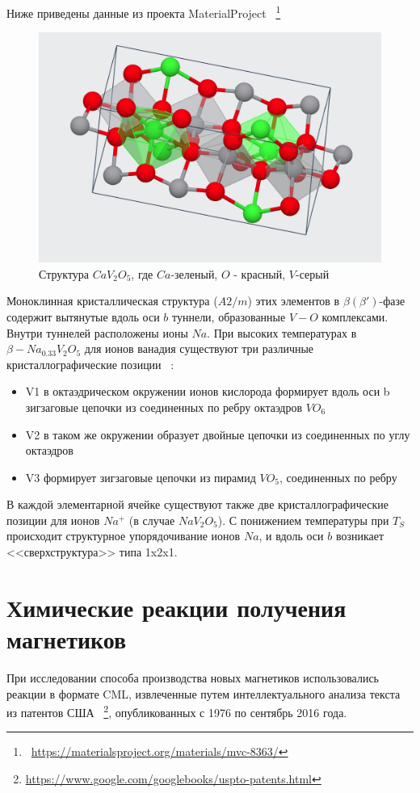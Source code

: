 \documentclass[11pt]{article}
\begin{document}
Ниже приведены данные из проекта MaterialProject ~\footnote{~\url{https://materialsproject.org/materials/mvc-8363/}}

\begin{figure}[htp]
\centering
\includegraphics[scale=0.7]{CaV_2O5}
\caption{Структура $CaV_2O_5$, где $Ca$-зеленый, $O$ - красный, $V$-серый}
\label{}
\end{figure}

Моноклинная кристаллическая структура ($A2/m$) этих элементов в $\beta (\beta')$-фазе содержит вытянутые вдоль оси $b$ туннели, образованные $V-O$ комплексами. Внутри туннелей расположены ионы $Na$. При высоких температурах в $\beta-Na_{0.33}V_2O_5$ для ионов ванадия существуют три различные кристаллографические позиции ~\cite{nm}:
\begin{itemize} 
\item V1 в октаэдрическом окружении ионов кислорода формирует вдоль оси b зигзаговые цепочки из соединенных по ребру октаэдров $VO_6$
\item V2 в таком же окружении образует двойные цепочки из соединенных по углу октаэдров
\item V3 формирует зигзаговые цепочки из пирамид $VO_5$, соединенных по ребру
\end{itemize} 

В каждой элементарной ячейке существуют также две кристаллографические позиции для ионов $Na^{+}$ (в случае $NaV_2O_5$). С понижением температуры при  $T_S$ происходит структурное упорядочивание ионов $Na$, и вдоль оси $b$ возникает <<сверхструктура>> типа 1x2x1.


\section{Химические реакции получения магнетиков}
При исследовании способа производства новых магнетиков использовались реакции в формате CML, извлеченные путем интеллектуального анализа текста из патентов США ~\footnote{\url{https://www.google.com/googlebooks/uspto-patents.html}}, опубликованных с 1976 по сентябрь 2016 года. 
\end{document}
